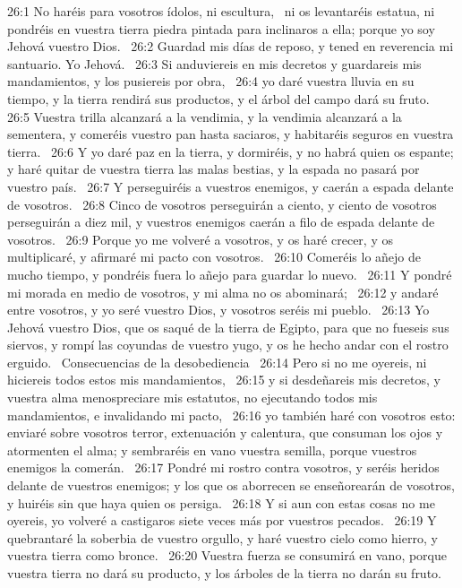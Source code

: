 26:1 No haréis para vosotros ídolos, ni escultura,  ni os levantaréis estatua, ni pondréis en vuestra tierra piedra pintada para inclinaros a ella; porque yo soy Jehová vuestro Dios.  
26:2 Guardad mis días de reposo, y tened en reverencia mi santuario. Yo Jehová.  
26:3 Si anduviereis en mis decretos y guardareis mis mandamientos, y los pusiereis por obra,  
26:4 yo daré vuestra lluvia en su tiempo, y la tierra rendirá sus productos, y el árbol del campo dará su fruto.  
26:5 Vuestra trilla alcanzará a la vendimia, y la vendimia alcanzará a la sementera, y comeréis vuestro pan hasta saciaros, y habitaréis seguros en vuestra tierra.  
26:6 Y yo daré paz en la tierra, y dormiréis, y no habrá quien os espante; y haré quitar de vuestra tierra las malas bestias, y la espada no pasará por vuestro país.  
26:7 Y perseguiréis a vuestros enemigos, y caerán a espada delante de vosotros.  
26:8 Cinco de vosotros perseguirán a ciento, y ciento de vosotros perseguirán a diez mil, y vuestros enemigos caerán a filo de espada delante de vosotros.  
26:9 Porque yo me volveré a vosotros, y os haré crecer, y os multiplicaré, y afirmaré mi pacto con vosotros.  
26:10 Comeréis lo añejo de mucho tiempo, y pondréis fuera lo añejo para guardar lo nuevo.  
26:11 Y pondré mi morada en medio de vosotros, y mi alma no os abominará;  
26:12 y andaré entre vosotros, y yo seré vuestro Dios, y vosotros seréis mi pueblo.  
26:13 Yo Jehová vuestro Dios, que os saqué de la tierra de Egipto, para que no fueseis sus siervos, y rompí las coyundas de vuestro yugo, y os he hecho andar con el rostro erguido.  
Consecuencias de la desobediencia   
26:14 Pero si no me oyereis, ni hiciereis todos estos mis mandamientos,  
26:15 y si desdeñareis mis decretos, y vuestra alma menospreciare mis estatutos, no ejecutando todos mis mandamientos, e invalidando mi pacto,  
26:16 yo también haré con vosotros esto: enviaré sobre vosotros terror, extenuación y calentura, que consuman los ojos y atormenten el alma; y sembraréis en vano vuestra semilla, porque vuestros enemigos la comerán.  
26:17 Pondré mi rostro contra vosotros, y seréis heridos delante de vuestros enemigos; y los que os aborrecen se enseñorearán de vosotros, y huiréis sin que haya quien os persiga.  
26:18 Y si aun con estas cosas no me oyereis, yo volveré a castigaros siete veces más por vuestros pecados.  
26:19 Y quebrantaré la soberbia de vuestro orgullo, y haré vuestro cielo como hierro, y vuestra tierra como bronce.  
26:20 Vuestra fuerza se consumirá en vano, porque vuestra tierra no dará su producto, y los árboles de la tierra no darán su fruto.  
